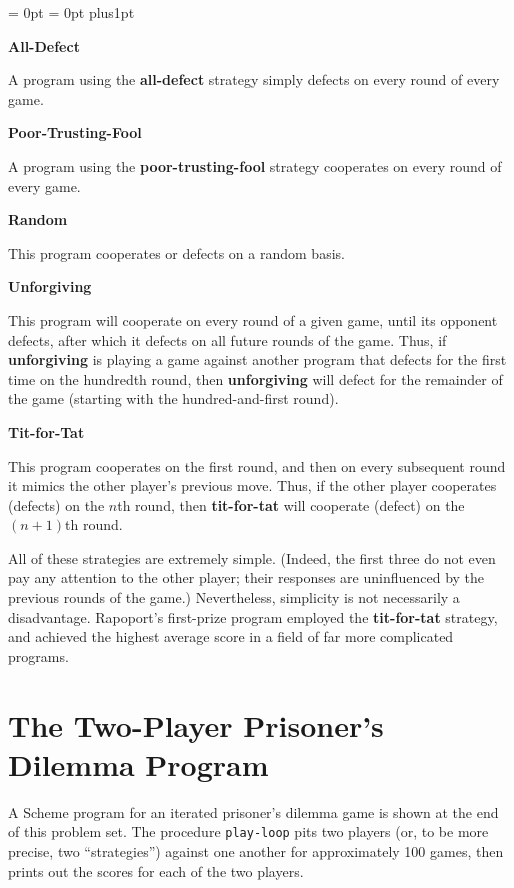 {\narrower \parindent = 0pt \parskip = 0pt plus1pt

\vskip 4pt

{\bf All-Defect}

A program using the {\bf all-defect} strategy simply defects on
every round of every game.

\vskip 4pt
\goodbreak
{\bf Poor-Trusting-Fool}

A program using the {\bf poor-trusting-fool} strategy cooperates
on every round of every game.

\vskip 4pt

{\bf Random}

This program cooperates or defects on a random basis.

\vskip 4pt

{\bf Unforgiving}

This program will cooperate on every round of a given game, until its
opponent defects, after which it defects on all future rounds of the
game. Thus, if {\bf unforgiving} is playing a game against another
program that defects for the first time on the hundredth round, then
{\bf unforgiving} will defect for the remainder of the game (starting
with the hundred-and-first round).

\vskip 4pt

{\bf Tit-for-Tat}

This program cooperates on the first round, and then on every subsequent
round it mimics the other player's previous move. Thus, if the other
player cooperates (defects) on the $n$th round, then {\bf tit-for-tat}
will cooperate (defect) on the $(n + 1)$th round.

\vskip 4pt

}

All of these strategies are extremely simple. (Indeed, the first three
do not even pay any attention to the other player; their responses are
uninfluenced by the previous rounds of the game.)  Nevertheless,
simplicity is not necessarily a disadvantage.  Rapoport's first-prize
program employed the {\bf tit-for-tat} strategy, and achieved the
highest average score in a field of far more complicated programs.


\section{The Two-Player Prisoner's Dilemma Program}

A Scheme program for an iterated prisoner's dilemma game is shown at
the end of this problem set. The procedure {\tt play-loop} pits two
players (or, to be more precise, two ``strategies'') against one another
for approximately 100 games, then prints out the scores for each of
the two players.

